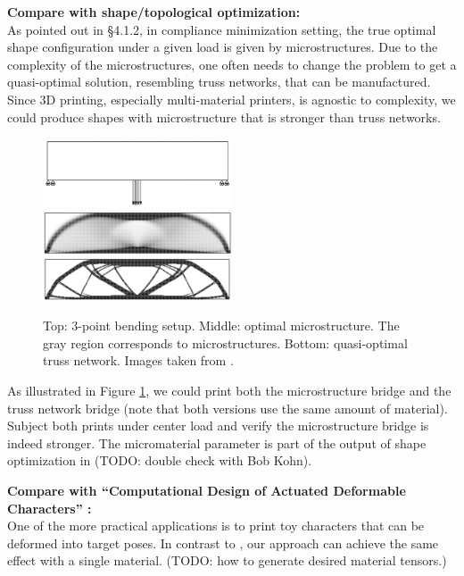 \begin{description}
\item{\bf Compare with shape/topological optimization:}\\
As pointed out in \cite{allaire2002shape} \S 4.1.2, in compliance minimization
setting, the true optimal shape configuration under a given load is given by
microstructures.  Due to the complexity of the microstructures, one often needs
to change the problem to get a quasi-optimal solution, resembling truss
networks, that can be manufactured.  Since 3D printing, especially
multi-material printers, is agnostic to complexity, we could produce shapes
with microstructure that is stronger than truss networks.

\begin{figure}
\centering
\includegraphics[width=0.5\textwidth]{images/3pt_bending}\\
\includegraphics[width=0.5\textwidth]{images/micro_struct_bridge}\\
\includegraphics[width=0.5\textwidth]{images/truss_network_bridge}\\
\caption{Top: 3-point bending setup.  Middle: optimal microstructure.  The gray
region corresponds to microstructures.  Bottom:
quasi-optimal truss network.  Images taken from
\cite{allaire1996homogenization}.}
\label{fig:3pt_bending}
\end{figure}

As illustrated in Figure \ref{fig:3pt_bending}, we could print both the
microstructure bridge and the truss network bridge (note that both versions use
the same amount of material).  Subject both prints under center load and verify
the microstructure bridge is indeed stronger.  The micromaterial parameter is
part of the output of shape optimization in \cite{allaire1996homogenization}
(TODO: double check with Bob Kohn).

\item{\bf Compare with ``Computational Design of Actuated Deformable
Characters''
\cite{Skouras:2013}:}\\
One of the more practical applications is to print toy characters that can be
deformed into target poses.  In contrast to \cite{Skouras:2013}, our approach
can achieve the same effect with a single material.
(TODO: how to generate desired material tensors.)


\end{description}
